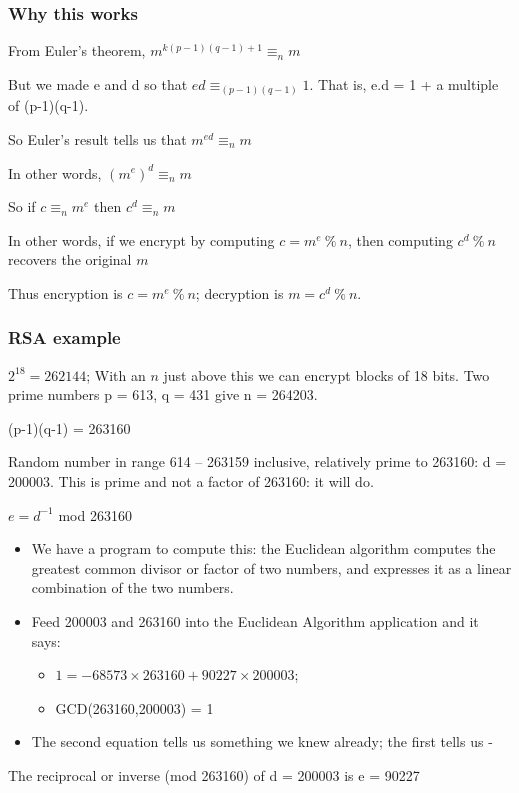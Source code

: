 \documentclass[10pt, hyperref={pdfpagelabels=false}]{beamer}
\begin{document}
\begin{frame}
\frametitle{Why this works}
From Euler’s theorem, $m^{k(p-1)(q-1)+1} \equiv_n m$

But we made e and d so that $e d \equiv_{(p-1)(q-1)} 1$. That is, e.d = 1 + a multiple of (p-1)(q-1). 

So Euler’s result tells us that $m^{ed} \equiv_n m$

In other words, $(m^e)^d \equiv_n m$

So if $c \equiv_n m^e$ then $c^d \equiv_n m$

In other words, if we encrypt by computing $c = m^e~\%~n$, then computing $c^d~\%~n$
recovers the original $m$

Thus encryption is {\color{blue}$c = m^e~\%~n$}; decryption is {\color{blue}$m = c^d~\%~n$}.
\end{frame}

\begin{frame}
\frametitle{RSA example}
$2^{18} = 262144$; With an $n$ just above this we can encrypt blocks of 18
bits. Two prime numbers p = 613, q = 431 give n = 264203.

(p-1)(q-1) = 263160

Random number in range 614 -- 263159 inclusive, relatively prime to
263160: d = 200003. This is prime and not a factor of 263160: it will do.

$e = d^{-1}$ mod 263160
\begin{itemize}
\item We have a program to compute this: the Euclidean algorithm computes the greatest common divisor or factor of two numbers, and expresses it as a linear combination of the two numbers.
\item Feed 200003 and 263160 into the Euclidean Algorithm application and it says:
  \begin{itemize}
  \item $1 = -68573 \times 263160 + 90227 \times 200003$;
  \item GCD(263160,200003) = 1
  \end{itemize}
\item The second equation tells us something we knew already; the first tells us -
\end{itemize}

The reciprocal or inverse (mod 263160) of d = 200003 is e = 90227
\end{frame}
\end{document}
